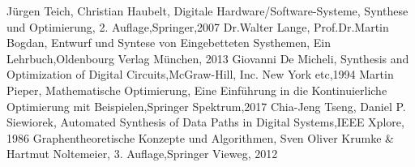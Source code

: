 \documentclass[conference]{IEEEtran}
\begin{document}
\begin{thebibliography}{00}
 Jürgen Teich, Christian Haubelt, Digitale Hardware/Software-Systeme, Synthese und Optimierung, 2. Auflage,Springer,2007
 Dr.Walter Lange, Prof.Dr.Martin Bogdan, Entwurf und Syntese von Eingebetteten Systhemen, Ein Lehrbuch,Oldenbourg Verlag München, 2013
 Giovanni De Micheli, Synthesis and Optimization of Digital Circuits,McGraw-Hill, Inc. New York etc,1994
 Martin Pieper, Mathematische Optimierung, Eine Einführung in die Kontinuierliche Optimierung mit Beispielen,Springer Spektrum,2017
 Chia-Jeng Tseng, Daniel P. Siewiorek, Automated Synthesis of Data Paths in Digital Systems,IEEE Xplore, 1986
 Graphentheoretische Konzepte und Algorithmen, Sven Oliver Krumke \& Hartmut Noltemeier, 3. Auflage,Springer Vieweg, 2012
\end{thebibliography}
\listoffigures
\listoftables
\vspace{12pt}
\end{document}
